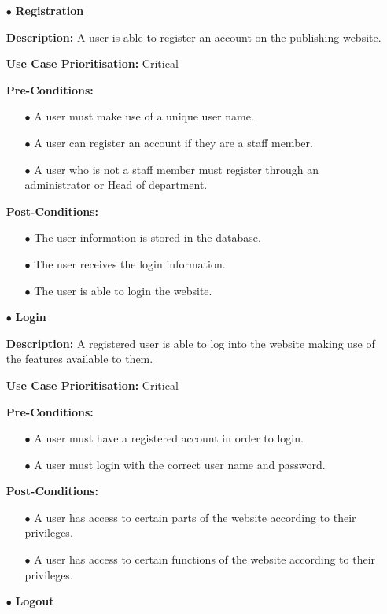 \documentclass[a4paper,12pt]{article}
\begin{document}
	\begin{itemize}
		\item[$\bullet$]\textbf{Registration}\newline
		
		\textbf{Description:} A user is able to register an account on the publishing website.\newline
		
		\textbf{Use Case Prioritisation:} Critical\newline
		
		\textbf{Pre-Conditions:}
			\begin{itemize}
				\item[$\bullet$]A user must make use of a unique user name.
				\item[$\bullet$]A user can register an account if they are a staff member.
			\item[$\bullet$]A user who is not a staff member must register through an administrator or Head of department.
			\\
		\end{itemize}
		\textbf{Post-Conditions: }
		\begin{itemize}
			\item[$\bullet$]The user information is stored in the database.
			\item[$\bullet$]The user receives the login information.
			\item[$\bullet$]The user is able to login the website.
			\\
		\end{itemize}
		\newpage
		\item[$\bullet$]\textbf{Login}\newline
		
		\textbf{Description:} A registered user is able to log into the website making use of the features available to them.\newline
		
		\textbf{Use Case Prioritisation:} Critical\newline
		
		\textbf{Pre-Conditions:}
		\begin{itemize}
			\item[$\bullet$]A user must have a registered account in order to login.
			\item[$\bullet$]A user must login with the correct user name and password.
			\\
		\end{itemize}
		\textbf{Post-Conditions: }
		\begin{itemize}
			\item[$\bullet$]A user has access to certain parts of the website according to their privileges.
			\item[$\bullet$]A user has access to certain functions of the website according to their privileges.
			\\
		\end{itemize}
		\item[$\bullet$]\textbf{Logout}\newline
	

\end{itemize}
\end{document}
